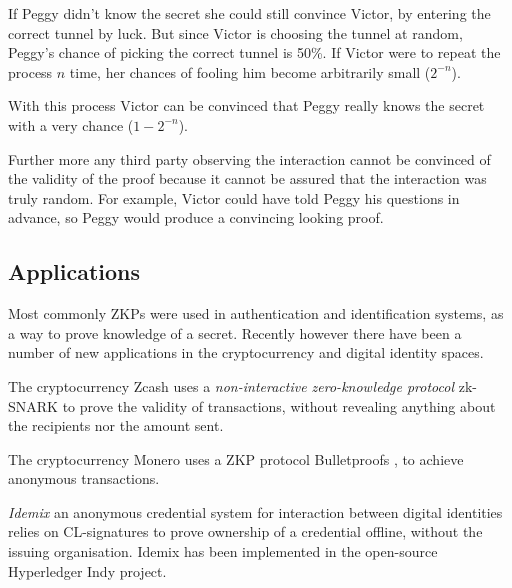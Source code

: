 \bigskip

If Peggy didn't know the secret she could still convince Victor, by entering the correct tunnel by luck.
But since Victor is choosing the tunnel at random, Peggy's chance of picking the correct tunnel is 50\%. If Victor were to repeat the process $n$ time, her chances of fooling him become arbitrarily small ($2^{-n}$).

With this process Victor can be convinced that Peggy really knows the secret with a very chance ($1 - 2^{-n}$).

\bigskip

Further more any third party observing the interaction cannot be convinced of the validity of the proof because it cannot be assured that the interaction was truly random. 
For example, Victor could have told Peggy his questions in advance, so Peggy would produce a convincing looking proof.

%

\subsection{Applications}
Most commonly ZKPs were used in authentication and identification systems, as a way to prove knowledge of a secret. 
Recently however there have been a number of new applications in the cryptocurrency and digital identity spaces.

The cryptocurrency Zcash uses a \textit{non-interactive zero-knowledge protocol} zk-SNARK \cite{bowe2018multi} to prove the validity of transactions, without revealing anything about the recipients nor the amount sent.

The cryptocurrency Monero uses a ZKP protocol Bulletproofs \cite{bunz2018bulletproofs}, to achieve anonymous transactions.

\textit{Idemix} \cite{camenisch2002design} an anonymous credential system for interaction between digital identities relies on CL-signatures \cite{camenisch2001efficient} to prove ownership of a credential offline, without the issuing organisation.
Idemix has been implemented in the open-source Hyperledger Indy project.

